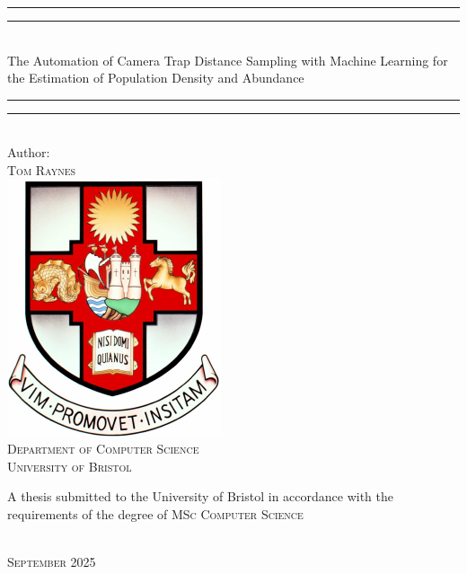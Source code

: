 \begin{titlepage}

    \vspace*{40mm}

    \begin{center}
        \rule[0.5ex]{\linewidth}{2pt}\vspace*{-\baselineskip}\vspace*{3.2pt}
        \rule[0.5ex]{\linewidth}{1pt}\\[\baselineskip]
        {\LARGE The Automation of Camera Trap Distance Sampling with Machine Learning
        for the Estimation of Population Density and Abundance}\\[4mm]
        \rule[0.5ex]{\linewidth}{1pt}\vspace*{-\baselineskip}\vspace{3.2pt}
        \rule[0.5ex]{\linewidth}{2pt}\\

        \vspace{6.5mm}
        {\large Author: \\
        \textsc{Tom Raynes}}\\

        \vspace{11mm}
        \includegraphics[scale=0.6]{logos/bristolcrest_colour}\\
        \vspace{6mm}
        \textsc{Department of Computer Science}\\
        \vspace{3mm}
        \textsc{University of Bristol}\\
        \vspace{12mm}
        \begin{minipage}{12cm}
            \centering
            A thesis submitted to the University of Bristol in accordance with the requirements of the degree of \textsc{MSc Computer Science}
        \end{minipage}\\
        \vspace{12mm}
        {\large\textsc{September 2025}}
        \vspace{11mm}
    \end{center}

\end{titlepage}
